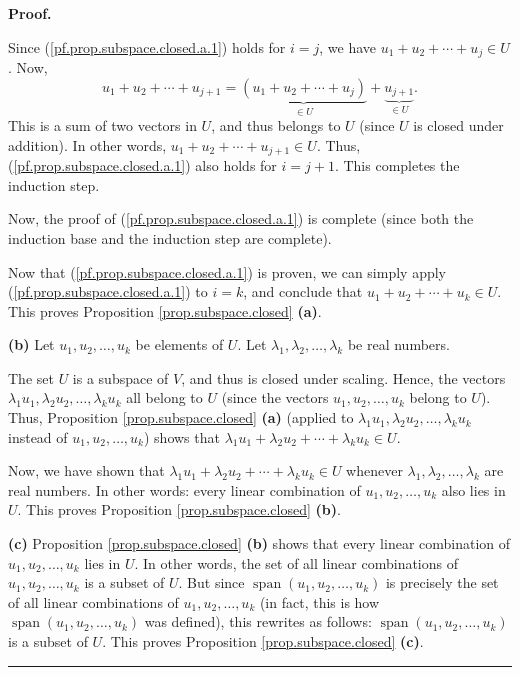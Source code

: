 \documentclass[numbers=enddot,12pt,final,onecolumn,notitlepage]{scrartcl}%
\theoremstyle{definition}
\newenvironment{proof}[1][Proof]{\noindent\textbf{#1.} }{\ \rule{0.5em}{0.5em}}
\begin{document}
\begin{proof}
\begin{enumerate}
Since (\ref{pf.prop.subspace.closed.a.1}) holds for $i=j$, we have
$u_{1}+u_{2}+\cdots+u_{j}\in U$. Now,%
\[
u_{1}+u_{2}+\cdots+u_{j+1}=\underbrace{\left(  u_{1}+u_{2}+\cdots
+u_{j}\right)  }_{\in U}+\underbrace{u_{j+1}}_{\in U}.
\]
This is a sum of two vectors in $U$, and thus belongs to $U$ (since $U$ is
closed under addition). In other words, $u_{1}+u_{2}+\cdots+u_{j+1}\in U$.
Thus, (\ref{pf.prop.subspace.closed.a.1}) also holds for $i=j+1$. This
completes the induction step.
\end{enumerate}

Now, the proof of (\ref{pf.prop.subspace.closed.a.1}) is complete (since both
the induction base and the induction step are complete).

Now that (\ref{pf.prop.subspace.closed.a.1}) is proven, we can simply apply
(\ref{pf.prop.subspace.closed.a.1}) to $i=k$, and conclude that $u_{1}%
+u_{2}+\cdots+u_{k}\in U$. This proves Proposition \ref{prop.subspace.closed}
\textbf{(a)}.

\textbf{(b)} Let $u_{1},u_{2},\ldots,u_{k}$ be elements of $U$. Let
$\lambda_{1},\lambda_{2},\ldots,\lambda_{k}$ be real numbers.

The set $U$ is a subspace of $V$, and thus is closed under scaling. Hence, the
vectors $\lambda_{1}u_{1},\lambda_{2}u_{2},\ldots,\lambda_{k}u_{k}$ all belong
to $U$ (since the vectors $u_{1},u_{2},\ldots,u_{k}$ belong to $U$). Thus,
Proposition \ref{prop.subspace.closed} \textbf{(a)} (applied to $\lambda
_{1}u_{1},\lambda_{2}u_{2},\ldots,\lambda_{k}u_{k}$ instead of $u_{1}%
,u_{2},\ldots,u_{k}$) shows that $\lambda_{1}u_{1}+\lambda_{2}u_{2}%
+\cdots+\lambda_{k}u_{k}\in U$.

Now, we have shown that $\lambda_{1}u_{1}+\lambda_{2}u_{2}+\cdots+\lambda
_{k}u_{k}\in U$ whenever $\lambda_{1},\lambda_{2},\ldots,\lambda_{k}$ are real
numbers. In other words: every linear combination of $u_{1},u_{2},\ldots
,u_{k}$ also lies in $U$. This proves Proposition \ref{prop.subspace.closed}
\textbf{(b)}.

\textbf{(c)} Proposition \ref{prop.subspace.closed} \textbf{(b)} shows that
every linear combination of $u_{1},u_{2},\ldots,u_{k}$ lies in $U$. In other
words, the set of all linear combinations of $u_{1},u_{2},\ldots,u_{k}$ is a
subset of $U$. But since $\operatorname{span}\left(  u_{1},u_{2},\ldots
,u_{k}\right)  $ is precisely the set of all linear combinations of
$u_{1},u_{2},\ldots,u_{k}$ (in fact, this is how $\operatorname{span}\left(
u_{1},u_{2},\ldots,u_{k}\right)  $ was defined), this rewrites as follows:
$\operatorname{span}\left(  u_{1},u_{2},\ldots,u_{k}\right)  $ is a subset of
$U$. This proves Proposition \ref{prop.subspace.closed} \textbf{(c)}.
\end{proof}
\end{document}

